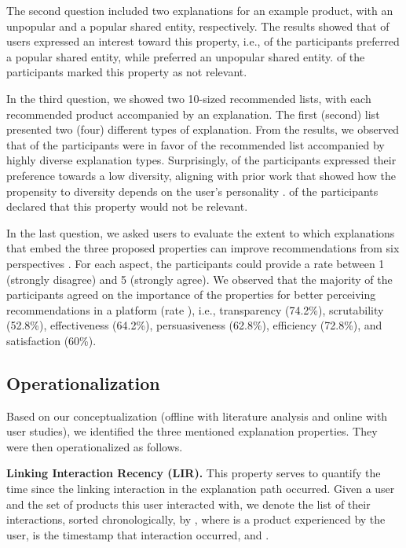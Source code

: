 \documentclass[sigconf]{acmart}
\begin{document}
The second question included two explanations for an example product, with an unpopular and a popular shared entity, respectively. 
The results showed that  of users expressed an interest toward this property, i.e.,  of the participants preferred a popular shared entity, while  preferred an unpopular shared entity.
 of the participants marked this property as not relevant. 

In the third question, we showed two 10-sized recommended lists, with each recommended product accompanied by an explanation.
The first (second) list presented two (four) different types of explanation.  
From the results, we observed that  of the participants were in favor of the recommended list accompanied by highly diverse explanation types. 
Surprisingly,  of the participants expressed their preference towards a low diversity, {\color{black} aligning with prior work that showed how the propensity to diversity depends on the user's personality \cite{10.1145/2468356.2468505}}.
 of the participants declared that this property would not be relevant.  

In the last question, we asked users to evaluate the extent to which explanations that embed the three proposed properties can improve recommendations from six perspectives \cite{Tintarev2007}. 
For each aspect, the participants could provide a rate between 1 (strongly disagree) and 5 (strongly agree). 
We observed that the majority of the participants agreed on the importance of the properties for better perceiving recommendations in a platform (rate ), i.e., transparency (74.2\%), scrutability (52.8\%), effectiveness (64.2\%), persuasiveness (62.8\%), efficiency (72.8\%), and satisfaction (60\%). 

\subsection{Operationalization}\label{subsec:operationalization}
Based on our conceptualization (offline with literature analysis and online with user studies), we identified the three mentioned explanation properties. They were then operationalized as follows. 

\vspace{1mm}\noindent\textbf{Linking Interaction Recency (LIR).} 
This property serves to quantify the time since the linking interaction in the explanation path occurred. 
Given a user  and the set  of products this user interacted with, we denote the list of their interactions, sorted chronologically, by , where  is a product experienced by the user,  is the timestamp that interaction occurred, and  . 
\end{document}
